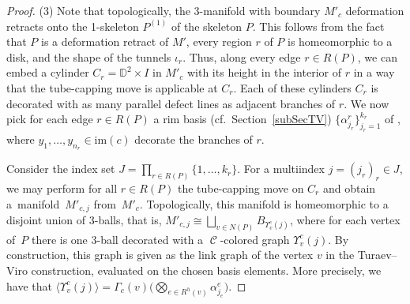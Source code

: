 \documentclass[pdftex]{sigma}
\DeclareMathOperator{\Hom}{Hom}
\DeclareMathOperator{\calc}{\mathcal{C}}
\numberwithin{equation}{section}
\theoremstyle{definition}
\begin{document}
\begin{proof}
 (3) Note that topologically, the 3-manifold with boundary $M'_c$ deformation retracts onto the 1-skeleton $P^{(1)}$ of the skeleton $P$. This follows from the fact that $P$ is a deformation retract of $M'$, every region $r$ of $P$ is homeomorphic to a disk, and the shape of the tunnels $\iota_r$. Thus, along every edge $r \in R(P)$, we can embed a cylinder $C_r = \mathbb{D}^2 \times I$ in $M'_c$ with its height in the interior of $r$ in a way that the tube-capping move is applicable at $C_r$. Each of these cylinders $C_r$ is decorated with as many parallel defect lines as adjacent branches of $r$. We now pick for each edge $r \in R(P)$ a rim basis (cf.\ Section~\ref{subSecTV}) $\{\alpha_{j_r}^r\}_{j_r=1}^{k_r}$ of \smash{$\Hom_{\calc}\bigl(y_1^{\varepsilon(1)} \otimes \dots \otimes y_{n_r}^{\varepsilon(n_r)}, \mathbbm{1}\bigr)$}, where $y_1, \dots, y_{n_r} \in \mathrm{im}(c)$ decorate the branches of $r$.

 Consider the index set $J = \prod_{r \in R(P)} \{1, \dots, k_r\}$. For a multiindex $j = (j_r)_r \in J$, we may perform for all $r \in R(P)$ the tube-capping move  on $C_r$ and obtain a~mani\-fold~$M'_{c,j}$ from~$M'_c$. Topologically, this manifold is homeomorphic to a disjoint union of 3-balls, that is, $M'_{c,j} \cong \bigsqcup_{v \in N(P)}B_{\Upsilon_v^c(j)}$, where for each vertex of~$P$ there is one 3-ball decorated with a $\calc$-colored graph $\Upsilon_v^c(j)$. By construction, this graph is given as the link graph of the vertex $v$ in the Turaev--Viro construction, evaluated on the chosen basis elements. More precisely, we have that $\langle\Upsilon_v^c(j)\rangle = \Gamma_c(v)\bigl( \bigotimes_{e \in R^h(v)}\alpha_{j_e}^e\bigr)$.


\end{proof}
\end{document}
